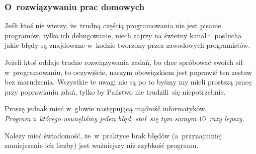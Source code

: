 \documentclass[10pt,t]{beamer}
\begin{document}
\begin{frame}
  \frametitle{O~rozwiązywaniu prac domowych}


  Jeśli ktoś nie wierzy, że~trudną częścią programowania nie jest pisanie
  programów, tylko ich debugowanie, niech zajrzy na świetny kanał
   i~posłucha
  jakie błędy są znajdowane w~kodzie tworzony przez zawodowych programistów.

  Jeżeli ktoś oddaje trudne rozwiązywania zadań, bo chce spróbować swoich
  sił w~programowaniu, to oczywiście, naszym obowiązkiem jest poprawić
  ten zestaw bez marudzenia. Wszystkie te uwagi nie są po to byśmy
  my mieli prostszą pracę przy poprawianiu zdań, tylko by Państwo nie
  trudzili~się niepotrzebnie.

  Proszę jednak mieć w~głowie następującą mądrość informatyków. \\
  \textit{Program z~którego usunęliśmy jeden błąd, stał~się tym samym
    $10$~razy lepszy.}

  Należy mieć świadomość, że~w~praktyce brak błędów (a~przynajmniej
  zmniejszenie ich liczby) jest ważniejszy niż szybkość programu.

\end{frame}
\end{document}
